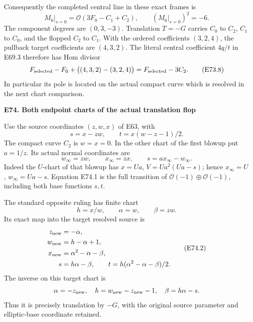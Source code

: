 Consequently the completed central line in these exact frames is
\[
 M_6|_{s=0}=\mathcal O(3F_0-C_1+C_2),\qquad
 (M_6|_{s=0})^2=-6.                              \tag{E73.7}
\]
The component degrees are \((0,3,-3)\). Translation \(T=-G\)
carries \(C_0\) to \(C_2\), \(C_1\) to \(C_0\), and the
flopped \(C_2\) to \(C_1\). With the ordered coefficients
\((3,2,4)\), the pullback target coefficients are \((4,3,2)\).
The literal central coefficient \(4q/t\) in E69.3 therefore
has Hom divisor
\[
 F_{\rm selected}-F_0+
  \bigl((4,3,2)-(3,2,4)\bigr)
       =F_{\rm selected}-3C_2.                 \tag{E73.8}
\]
In particular its pole is located on the actual compact curve
which is resolved in the next chart comparison.

\par

\medskip\noindent\textbf{E74. Both endpoint charts of the actual translation flop}

\par\nobreak

Use the source coordinates \((z,w,x)\) of E63, with
\[
        s=x-zw,\qquad t=x(w-z-1)/2.
\]
The compact curve \(C_2\) is \(w=x=0\). In the other chart of
the first blowup put \(a=1/z\). Its actual normal coordinates
are
\[
       w_\infty=zw,\qquad x_\infty=zx,\qquad
       s=a x_\infty-w_\infty.                   \tag{E74.1}
\]
Indeed the \(U\)-chart of that blowup has
\(x=Ua\), \(V=Ua^2(Ua-s)\); hence
\(x_\infty=U\), \(w_\infty=Ua-s\). Equation E74.1
is the full transition of \(\mathcal O(-1)\oplus\mathcal O(-1)\),
including both base functions \(s,t\).

The standard opposite ruling has finite chart
\[
       h=x/w,\qquad \alpha=w,\qquad \beta=zw.
\]
Its exact map into the target resolved source is
\[
\begin{aligned}
 z_{\rm new}&=-\alpha,\\
 w_{\rm new}&=h-\alpha+1,\\
 x_{\rm new}&=\alpha^2-\alpha-\beta,\\
 s&=h\alpha-\beta,\qquad
 t=h(\alpha^2-\alpha-\beta)/2.                  
\end{aligned} \tag{E74.2}
\]
The inverse on this target chart is
\[
 \alpha=-z_{\rm new},\quad
 h=w_{\rm new}-z_{\rm new}-1,\quad
 \beta=h\alpha-s.
\]
Thus it is precisely translation by \(-G\), with the original
source parameter and elliptic-base coordinate retained.

